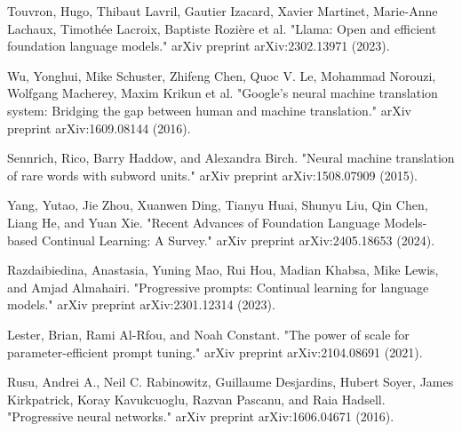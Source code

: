 \documentclass[runningheads]{llncs}
\begin{document}
\begin{thebibliography}{8}
Touvron, Hugo, Thibaut Lavril, Gautier Izacard, Xavier Martinet, Marie-Anne Lachaux, Timothée Lacroix, Baptiste Rozière et al. "Llama: Open and efficient foundation language models." arXiv preprint arXiv:2302.13971 (2023).

Wu, Yonghui, Mike Schuster, Zhifeng Chen, Quoc V. Le, Mohammad Norouzi, Wolfgang Macherey, Maxim Krikun et al. "Google's neural machine translation system: Bridging the gap between human and machine translation." arXiv preprint arXiv:1609.08144 (2016).

Sennrich, Rico, Barry Haddow, and Alexandra Birch. "Neural machine translation of rare words with subword units." arXiv preprint arXiv:1508.07909 (2015).

Yang, Yutao, Jie Zhou, Xuanwen Ding, Tianyu Huai, Shunyu Liu, Qin Chen, Liang He, and Yuan Xie. "Recent Advances of Foundation Language Models-based Continual Learning: A Survey." arXiv preprint arXiv:2405.18653 (2024).

Razdaibiedina, Anastasia, Yuning Mao, Rui Hou, Madian Khabsa, Mike Lewis, and Amjad Almahairi. "Progressive prompts: Continual learning for language models." arXiv preprint arXiv:2301.12314 (2023).

Lester, Brian, Rami Al-Rfou, and Noah Constant. "The power of scale for parameter-efficient prompt tuning." arXiv preprint arXiv:2104.08691 (2021).

Rusu, Andrei A., Neil C. Rabinowitz, Guillaume Desjardins, Hubert Soyer, James Kirkpatrick, Koray Kavukcuoglu, Razvan Pascanu, and Raia Hadsell. "Progressive neural networks." arXiv preprint arXiv:1606.04671 (2016).
\end{thebibliography}
\end{document}
